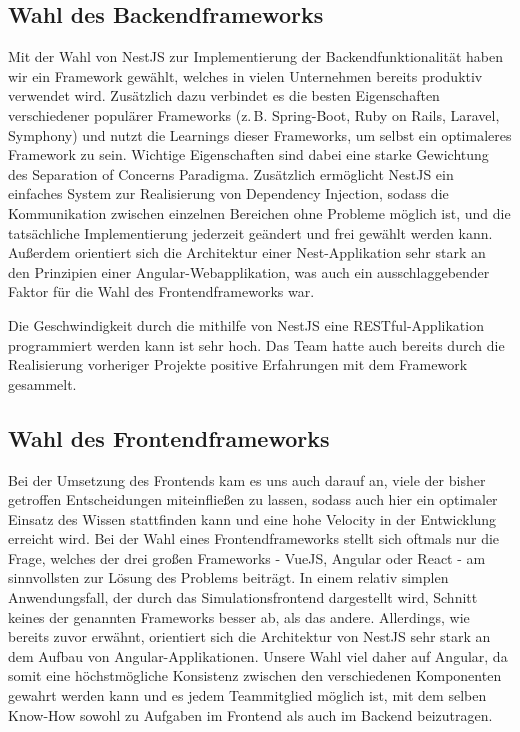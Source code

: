 \subsection*{Wahl des Backendframeworks}

Mit der Wahl von NestJS zur Implementierung der Backendfunktionalität haben wir ein Framework gewählt, welches in vielen Unternehmen bereits produktiv verwendet wird. Zusätzlich dazu verbindet es die besten Eigenschaften verschiedener populärer Frameworks (z.\,B. Spring-Boot, Ruby on Rails, Laravel, Symphony) und nutzt die Learnings dieser Frameworks, um selbst ein optimaleres Framework zu sein. Wichtige Eigenschaften sind dabei eine starke Gewichtung des Separation of Concerns Paradigma. Zusätzlich ermöglicht NestJS ein einfaches System zur Realisierung von Dependency Injection, sodass die Kommunikation zwischen einzelnen Bereichen ohne Probleme möglich ist, und die tatsächliche Implementierung jederzeit geändert und frei gewählt werden kann.\\
Außerdem orientiert sich die Architektur einer Nest-Applikation sehr stark an den Prinzipien einer Angular-Webapplikation, was auch ein ausschlaggebender Faktor für die Wahl des Frontendframeworks war.

Die Geschwindigkeit durch die mithilfe von NestJS eine RESTful-Applikation programmiert werden kann ist sehr hoch. Das Team hatte auch bereits durch die Realisierung vorheriger Projekte positive Erfahrungen mit dem Framework gesammelt.

\subsection*{Wahl des Frontendframeworks}
Bei der Umsetzung des Frontends kam es uns auch darauf an, viele der bisher getroffen Entscheidungen miteinfließen zu lassen, sodass auch hier ein optimaler Einsatz des Wissen stattfinden kann und eine hohe Velocity in der Entwicklung erreicht wird. Bei der Wahl eines Frontendframeworks stellt sich oftmals nur die Frage, welches der drei großen Frameworks - VueJS, Angular oder React - am sinnvollsten zur Lösung des Problems beiträgt. In einem relativ simplen Anwendungsfall, der durch das Simulationsfrontend dargestellt wird, Schnitt keines der genannten Frameworks besser ab, als das andere. Allerdings, wie bereits zuvor erwähnt, orientiert sich die Architektur von NestJS sehr stark an dem Aufbau von Angular-Applikationen. Unsere Wahl viel daher auf Angular, da somit eine höchstmögliche Konsistenz zwischen den verschiedenen Komponenten gewahrt werden kann und es jedem Teammitglied möglich ist, mit dem selben Know-How sowohl zu Aufgaben im Frontend als auch im Backend beizutragen.


